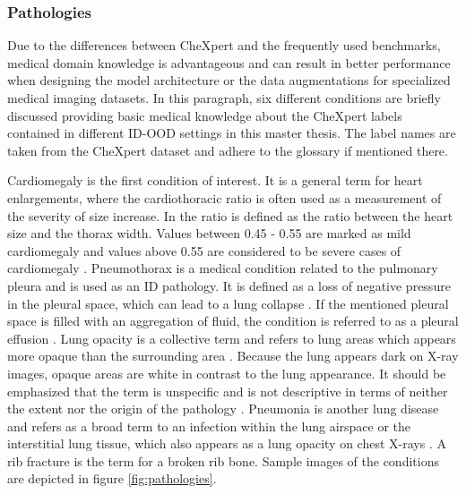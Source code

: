 \subsubsection{Pathologies}
Due to the differences between CheXpert and the frequently used benchmarks, medical domain knowledge is advantageous and can result in better performance when designing the model architecture or the data augmentations for specialized medical imaging datasets.
In this paragraph, six different conditions are briefly discussed providing basic medical knowledge about the CheXpert labels contained in different ID-OOD settings in this master thesis.
The label names are taken from the CheXpert dataset \citep{Irvin2019} and adhere to the glossary \citep{Hansell2008} if mentioned there.
\par
Cardiomegaly is the first condition of interest.
It is a general term for heart enlargements, where the cardiothoracic ratio is often used as a measurement of the severity of size increase.
In \citep{Dahnert2011} the ratio is defined as the ratio between the heart size and the thorax width. 
Values between 0.45 - 0.55 are marked as mild cardiomegaly and values above 0.55 are considered to be severe cases of cardiomegaly \citep{Dahnert2011}.
Pneumothorax is a medical condition related to the pulmonary pleura and is used as an ID pathology.
It is defined as a loss of negative pressure in the pleural space, which can lead to a lung collapse \citep{Dahnert2011, Hansell2008}.
If the mentioned pleural space is filled with an aggregation of fluid, the condition is referred to as a pleural effusion \citep{Karkhanis2012}.
Lung opacity is a collective term and refers to lung areas which appears more opaque than the surrounding area \citep{Hansell2008}.
Because the lung appears dark on X-ray images, opaque areas are white in contrast to the lung appearance.
It should be emphasized that the term is unspecific and is not descriptive in terms of neither the extent nor the origin of the pathology \citep{Hansell2008}.
Pneumonia is another lung disease and refers as a broad term to an infection within the lung airspace or the interstitial lung tissue, which also appears as a lung opacity on chest X-rays \citep{Hansell2008}.
A rib fracture is the term for a broken rib bone.
Sample images of the conditions are depicted in figure \ref{fig:pathologies}.
